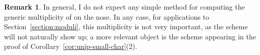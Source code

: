 \documentclass[11pt,reqno]{amsart}
\makeatletter
\theoremstyle{definition}
\newtheorem{remark}[theorem]{Remark}
\newcommand{\bA}{{\mathbf A}}
\newcommand{\bt}{{\mathbf t}}
\newcommand{\sC}{{\mathscr C}}
\DeclareMathOperator{\GL}{GL}
\newcommand{\ov}[1]{\overline{#1}}
\newcounter{mathrecordid}
\newcommand{\mathboxbegin}[1]{%
  \stepcounter{mathrecordid}%
  \immediate\write\mathrecords{\themathrecordid,#1}%
  \special{pdf:bann << /Type /Annot /Subtype /Link /Border [0 0 0]
    /MathBoxID \themathrecordid /F 2
    /A << /S /URI /URI (urn:mathbox:\themathrecordid) >> >>}}
\newcommand{\mathboxinlineplain}[1]{$#1$}
\newcommand{\mathboxinline}[1]{%
  $\mathboxbegin{inline}%
  \special{pdf:literal direct /MathBoxBegin\themathrecordid\space MP}%
  #1\special{pdf:literal direct /MathBoxEnd\themathrecordid\space MP}%
  \special{pdf:eann}$}
\newcommand{\recordmath}{%
  \ifmeasuring@\expandafter\mathboxinlineplain
  \else\expandafter\mathboxinline\fi}
\makeatother
\begin{document}
\begin{remark}
    In general, I do not expect any simple method for computing the generic multiplicity of \recordmath{\chi^{-1}(\chi(t))} on the nose. In any case, for applications to Section~\ref{section:moduli}, this multiplicity is not very important, as the scheme \recordmath{\chi^{-1}(\chi(t))} will not naturally show up; a more relevant object is the scheme \recordmath{\sC_{\bt}} appearing in the proof of Corollary~\ref{cor:unip-small-char}(2).

\end{remark}
\end{document}
